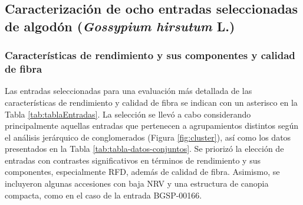 \documentclass[12pt,oneside]{reedthesis}
\begin{document}
\subsection{\texorpdfstring{Caracterización de ocho entradas seleccionadas de algodón (\emph{Gossypium hirsutum} L.)}{Caracterización de ocho entradas seleccionadas de algodón (Gossypium hirsutum L.)}}\label{caracterizaciuxf3n-de-ocho-entradas-seleccionadas-de-algoduxf3n-gossypium-hirsutum-l.-1}

\subsubsection{Características de rendimiento y sus componentes y calidad de fibra}\label{caracteruxedsticas-de-rendimiento-y-sus-componentes-y-calidad-de-fibra}

Las entradas seleccionadas para una evaluación más detallada de las características de rendimiento y calidad de fibra se indican con un asterisco en la Tabla \ref{tab:tablaEntradas}. La selección se llevó a cabo considerando principalmente aquellas entradas que pertenecen a agrupamientos distintos según el análisis jerárquico de conglomerados (Figura \ref{fig:cluster}), así como los datos presentados en la Tabla \ref{tab:tabla-datos-conjuntos}. Se priorizó la elección de entradas con contrastes significativos en términos de rendimiento y sus componentes, especialmente RFD, además de calidad de fibra. Asimismo, se incluyeron algunas accesiones con baja NRV y una estructura de canopia compacta, como en el caso de la entrada BGSP-00166.
\end{document}
